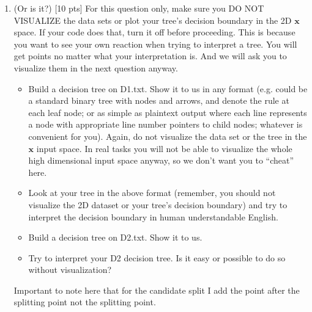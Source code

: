 \documentclass[a4paper]{article}
\theoremstyle{definition}
\def\x{\mathbf x}
\newenvironment{soln}{
    \leavevmode\color{blue}\ignorespaces
}{}
\begin{document}
\begin{enumerate}
\begin{soln}
  Important to note here that for the candidate split I add the point after the splitting point not the splitting point. See Fig.~\ref{fig:D3leaves} for the tree and the rules are as follows:

  \begin{figure}[H]
    \centering
    \texttt{[image: ../images/D3leaves.png]}
    \caption{D3leaves Decision tree}
    \label{fig:D3leaves}
  \end{figure}
\end{soln}


\item (Or is it?)  [10 pts] For this question only, make sure you DO NOT VISUALIZE the data sets or plot your tree's decision boundary in the 2D $\x$ space.  If your code does that, turn it off before proceeding.  This is because you want to see your own reaction when trying to interpret a tree.  You will get points no matter what your interpretation is.
And we will ask you to visualize them in the next question anyway.
  \begin{itemize}
  
  \item Build a decision tree on D1.txt.  Show it to us in any format (e.g. could be a standard binary tree with nodes and arrows, and denote the rule at each leaf node; or as simple as plaintext output where each line represents a node with appropriate line number pointers to child nodes; whatever is convenient for you). Again, do not visualize the data set or the tree in the $\x$ input space.  In real tasks you will not be able to visualize the whole high dimensional input space anyway, so we don't want you to ``cheat'' here. 
  
  \item Look at your tree in the above format (remember, you should not visualize the 2D dataset or your tree's decision boundary) and try to interpret the decision boundary in human understandable English. 
  
  \item Build a decision tree on D2.txt.  Show it to us. 
  
  \item Try to interpret your D2 decision tree. Is it easy or possible to do so without visualization? \\
  
  \end{itemize}

\begin{soln}
  Important to note here that for the candidate split I add the point after the splitting point not the splitting point.


\end{soln}
\end{enumerate}
\end{document}
